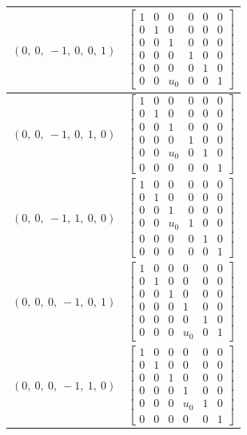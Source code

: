 \documentclass[11pt]{article}
\theoremstyle{definition}
\begin{document}
\begin{longtable}{|l|c|}
    \hline
    $\left( 0, \  0, \  -1, \  0, \  0, \  1\right)$ & ${\left[\begin{matrix}1 & 0 & 0 & 0 & 0 & 0\\0 & 1 & 0 & 0 & 0 & 0\\0 & 0 & 1 & 0 & 0 & 0\\0 & 0 & 0 & 1 & 0 & 0\\0 & 0 & 0 & 0 & 1 & 0\\0 & 0 & u_{0} & 0 & 0 & 1\end{matrix}\right]}$ \\
    \hline
    $\left( 0, \  0, \  -1, \  0, \  1, \  0\right)$ & ${\left[\begin{matrix}1 & 0 & 0 & 0 & 0 & 0\\0 & 1 & 0 & 0 & 0 & 0\\0 & 0 & 1 & 0 & 0 & 0\\0 & 0 & 0 & 1 & 0 & 0\\0 & 0 & u_{0} & 0 & 1 & 0\\0 & 0 & 0 & 0 & 0 & 1\end{matrix}\right]}$ \\
    \hline
    $\left( 0, \  0, \  -1, \  1, \  0, \  0\right)$ & ${\left[\begin{matrix}1 & 0 & 0 & 0 & 0 & 0\\0 & 1 & 0 & 0 & 0 & 0\\0 & 0 & 1 & 0 & 0 & 0\\0 & 0 & u_{0} & 1 & 0 & 0\\0 & 0 & 0 & 0 & 1 & 0\\0 & 0 & 0 & 0 & 0 & 1\end{matrix}\right]}$ \\
    \hline
    $\left( 0, \  0, \  0, \  -1, \  0, \  1\right)$ & ${\left[\begin{matrix}1 & 0 & 0 & 0 & 0 & 0\\0 & 1 & 0 & 0 & 0 & 0\\0 & 0 & 1 & 0 & 0 & 0\\0 & 0 & 0 & 1 & 0 & 0\\0 & 0 & 0 & 0 & 1 & 0\\0 & 0 & 0 & u_{0} & 0 & 1\end{matrix}\right]}$ \\
    \hline
    $\left( 0, \  0, \  0, \  -1, \  1, \  0\right)$ & ${\left[\begin{matrix}1 & 0 & 0 & 0 & 0 & 0\\0 & 1 & 0 & 0 & 0 & 0\\0 & 0 & 1 & 0 & 0 & 0\\0 & 0 & 0 & 1 & 0 & 0\\0 & 0 & 0 & u_{0} & 1 & 0\\0 & 0 & 0 & 0 & 0 & 1\end{matrix}\right]}$ \\

\end{longtable}
\end{document}
